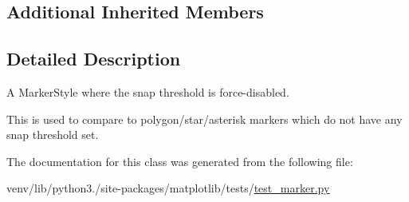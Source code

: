 \subsection*{Additional Inherited Members}


\subsection{Detailed Description}
\begin{DoxyVerb}A MarkerStyle where the snap threshold is force-disabled.

This is used to compare to polygon/star/asterisk markers which do not have
any snap threshold set.
\end{DoxyVerb}
 

The documentation for this class was generated from the following file\+:\begin{DoxyCompactItemize}
\item 
venv/lib/python3./site-\/packages/matplotlib/tests/\hyperlink{test__marker_8py}{test\+\_\+marker.\+py}\end{DoxyCompactItemize}
